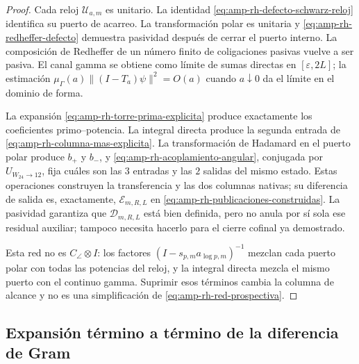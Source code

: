 \begin{proof}
Cada reloj \(\mathscr U_{a,m}\) es unitario.
La identidad \eqref{eq:amp-rh-defecto-schwarz-reloj} identifica su puerto
de acarreo. La transformación polar es unitaria y
\eqref{eq:amp-rh-redheffer-defecto} demuestra pasividad después de cerrar
el puerto interno. La composición de Redheffer de un número finito de
coligaciones pasivas vuelve a ser pasiva. El canal gamma se obtiene como
límite de sumas directas en \([\varepsilon,2L]\); la estimación
\(\mu_\Gamma(a)\|(I-T_a)\psi\|^2=O(a)\) cuando \(a\downarrow0\)
da el límite en el dominio de forma.

La expansión \eqref{eq:amp-rh-torre-prima-explicita} produce exactamente
los coeficientes primo--potencia. La integral directa produce la segunda
entrada de \eqref{eq:amp-rh-columna-mas-explicita}. La transformación de
Hadamard en el puerto polar produce \(b_+\) y \(b_-\), y
\eqref{eq:amp-rh-acoplamiento-angular}, conjugada por
\(U_{W_{24}\to12}\), fija cuáles son las \(3\) entradas y las \(2\)
salidas del mismo estado. Estas operaciones construyen la transferencia y
las dos columnas nativas; su diferencia de salida es, exactamente,
\(\mathcal E_{m,R,L}\) en
\eqref{eq:amp-rh-publicaciones-construidas}. La pasividad garantiza que
\(\mathscr D_{m,R,L}\) está bien definida, pero no anula por sí sola ese
residual auxiliar; tampoco necesita hacerlo para el cierre cofinal ya
demostrado.

Esta red no es \(C_\angle\otimes I\): los factores
\((I-s_{p,m}a_{\log p,m})^{-1}\) mezclan cada puerto polar con todas las
potencias del reloj, y la integral directa mezcla el mismo puerto con el
continuo gamma. Suprimir esos términos cambia la columna de alcance y no
es una simplificación de \eqref{eq:amp-rh-red-prospectiva}.
\end{proof}

\subsection*{Expansión término a término de la diferencia de Gram}

